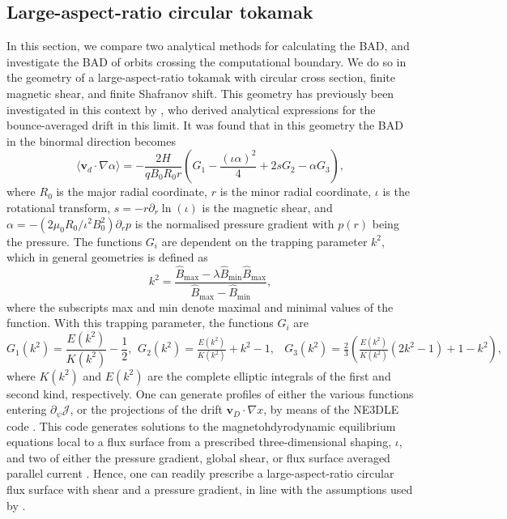 \subsection{Large-aspect-ratio circular tokamak} \label{sec:tokamak-CHM}
In this section, we compare two analytical methods for calculating the BAD, and investigate the BAD of orbits crossing the computational boundary. We do so in the geometry of a large-aspect-ratio tokamak with circular cross section, finite magnetic shear, and finite Shafranov shift. This geometry has previously been investigated in this context by \citet{connor1983effect}, who derived analytical expressions for the bounce-averaged drift in this limit. It was found that in this geometry the BAD in the binormal direction becomes
\begin{equation}
    \langle \mathbf{v}_d \cdot \nabla \alpha \rangle = - \frac{2 H}{q B_0 R_0 r} \left( G_1 - \frac{(\iota \alpha)^2}{4} + 2 s G_2 - \alpha G_3  \right),
\end{equation}
where $R_0$ is the major radial coordinate, $r$ is the minor radial coordinate, $\iota$ is the rotational transform, $s = - r \partial_r \ln(\iota)$ is the magnetic shear, and $\alpha = - (2 \mu_0 R_0/ \iota^2 B_0^2) \partial_r p $ is the normalised pressure gradient with $p(r)$ being the pressure. The functions $G_i$ are dependent on the trapping parameter $k^2$, which in general geometries is defined as 
\begin{equation}
    k^2 = \frac{\hat{B}_\mathrm{max} - \lambda \hat{B}_\mathrm{min} \hat{B}_\mathrm{max} }{\hat{B}_\mathrm{max} -  \hat{B}_\mathrm{min} },
    \label{eq:k2-def}
\end{equation}
where the subscripts max and min denote maximal and minimal values of the function. With this trapping parameter, the functions $G_i$ are
\begin{subequations}
\label{eq:whole}
\begin{equation}
G_1(k^2) = \frac{E(k^2)}{K(k^2)} - \frac{1}{2},
\end{equation}
\begin{eqnarray}
G_2(k^2) = \frac{E(k^2)}{K(k^2)} + k^2 - 1,
\end{eqnarray}
\begin{eqnarray}
G_3(k^2) = \frac{2}{3} \left( \frac{E(k^2)}{K(k^2)} (2k^2 - 1) + 1 - k^2 \right),
\end{eqnarray}
\end{subequations}
where $K(k^2)$ and $E(k^2)$ are the complete elliptic integrals of the first and second kind, respectively. One can generate profiles of either the various functions entering $\partial_\psi \mathcal{J}$, or the projections of the drift $\mathbf{v}_D \cdot \nabla x$, by means of the NE3DLE code \cite{JDuff_NE3DLE}. This code generates solutions to the magnetohdyrodynamic equilibrium equations local to a flux surface from a prescribed three-dimensional shaping, $\iota$, and two of either the pressure gradient, global shear, or flux surface averaged parallel current \cite{hegna2000local}. Hence, one can readily prescribe a large-aspect-ratio circular flux surface with shear and a pressure gradient, in line with the assumptions used by \citet{connor1983effect}.
